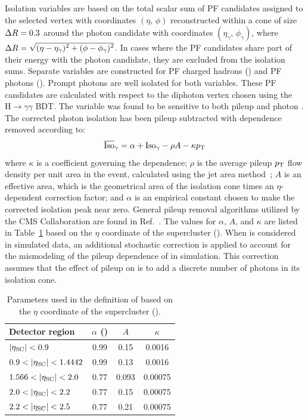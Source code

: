 Isolation variables are based on the total scalar \pt sum of PF candidates assigned to the selected vertex with coordinates $(\eta,\,\phi)$ reconstructed within a cone of size $\Delta R = 0.3$ around the photon candidate with coordinates $(\eta_\gamma,\,\phi_\gamma)$, where $\Delta R = \sqrt{\smash[b]{(\eta - \eta_\gamma)^2 +(\phi-\phi_\gamma)^2}}$. In cases where the PF candidates share part of their energy with the photon candidate, they are excluded from the isolation sums. Separate variables are constructed for PF charged hadrons (\chiso) and PF photons (\phoiso). Prompt photons are well isolated for both variables. These PF candidates are calculated with respect to the diphoton vertex chosen using the $\mathrm{H} \to \gamma\gamma$ BDT. The \phoiso variable was found to be sensitive to both pileup and photon \pt. The corrected photon isolation has been pileup subtracted with \pt dependence removed according to:
\begin{equation}
	\overline{\mbox{Iso}}_\gamma = \alpha + \text{Iso}_{\gamma} - \rho A - \kappa p_{\mathrm{T}}
\end{equation}
where $\kappa$ is a coefficient governing the \pt dependence; $\rho$ is the average pileup $p_{\mathrm{T}}$ flow density per unit area in the event, calculated using the jet area method~\cite{Cacciari:2007fd,Cacciari:2008gn}; $A$ is an effective area, which is the geometrical area of the isolation cone times an $\eta$-dependent correction factor; and $\alpha$ is an empirical constant chosen to make the corrected isolation peak near zero. General pileup removal algorithms utilized by the CMS Collaboration are found in Ref.~\cite{CMS-PAS-JME-14-001}. The values for $\alpha$, $A$, and $\kappa$ are listed in Table~\ref{tab:corphoiso_values} based on the $\eta$ coordinate of the supercluster (\scEta). When \corphoiso is considered in simulated data, an additional stochastic correction is applied to account for the mismodeling of the pileup dependence of \phoiso in simulation. This correction assumes that the effect of pileup on \phoiso is to add a discrete number of photons in its isolation cone.

\begin{table}[!htbp]
	\centering
	\caption{Parameters used in the definition of \corphoiso based on the $\eta$ coordinate of the supercluster (\scEta).}
	\vspace{\baselineskip}
	\begin{tabular}{l|ccc}
	\hline \hline
	Detector region       & $\alpha$ ({\GeVns}) & $A$ & $\kappa$ \\
	\hline
	$|\eta_{\mathrm{SC}}|<0.9$        & 0.99 & 0.15  & 0.0016 \\
	$0.9<|\scEta|<1.4442$ & 0.99 & 0.13  & 0.0016 \\
	$1.566<|\scEta|<2.0$  & 0.77 & 0.093 & 0.00075  \\
	$2.0<|\scEta|<2.2$    & 0.77 & 0.15  & 0.00075  \\
	$2.2<|\scEta|<2.5$    & 0.77 & 0.21  & 0.00075  \\
	\hline \hline
	\end{tabular}
	\label{tab:corphoiso_values}
\end{table}

